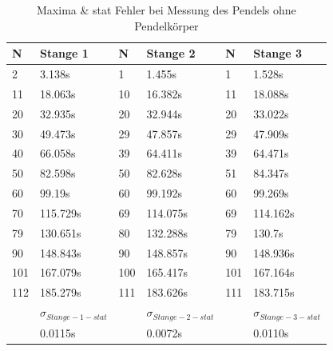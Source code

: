 \documentclass[twoside]{protokoll}
\begin{document}
\begin{table}[H]
    \centering
    \begin{tabularx}{1.0\textwidth}{X X X X X X}
       \textbf{N}  & \textbf{Stange 1} & \textbf{N} & \textbf{Stange 2} & \textbf{N} & \textbf{Stange 3} \\
       \toprule
       2 & 3.138s &  1 & 1.455s &  1 & 1.528s \\
       11 & 18.063s &  10 & 16.382s &  11 & 18.088s \\
       20 & 32.935s &  20 & 32.944s &  20 & 33.022s \\
       30 & 49.473s &  29 & 47.857s &  29 & 47.909s \\
       40 & 66.058s &  39 & 64.411s &  39 & 64.471s \\
       50 & 82.598s &  50 & 82.628s &  51 & 84.347s \\
       60 & 99.19s &  60 & 99.192s &  60 & 99.269s \\
       70 & 115.729s &  69 & 114.075s &  69 & 114.162s \\
       79 & 130.651s &  80 & 132.288s &  79 & 130.7s \\
       90 & 148.843s &  90 & 148.857s &  90 & 148.936s \\
       101 & 167.079s &  100 & 165.417s &  101 & 167.164s \\
       112 & 185.279s &  111 & 183.626s &  111 & 183.715s \\
       \midrule
        & \textbf{$\sigma_{Stange-1-stat}$} & & \textbf{$\sigma_{Stange-2-stat}$} & & \textbf{$\sigma_{Stange-3-stat}$} \\
       \midrule
        & 0.0115s & & 0.0072s & & 0.0110s \\
       \toprule
    \end{tabularx}
    \caption{Maxima \& stat Fehler bei Messung des Pendels ohne Pendelkörper}
\end{table}

 
 
\end{document}
